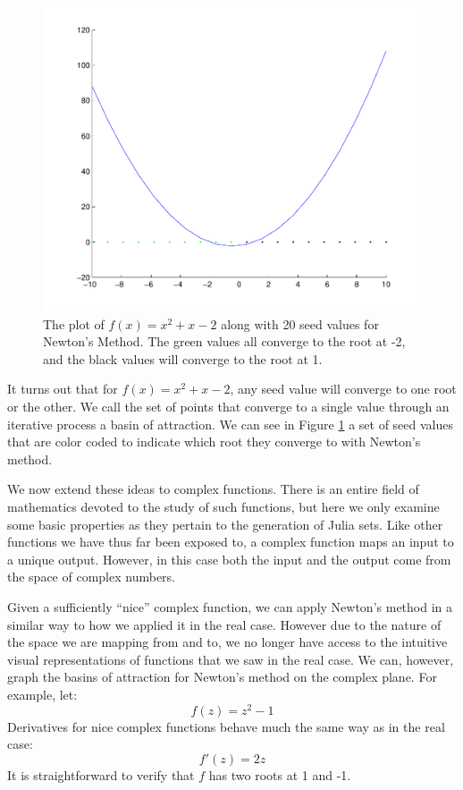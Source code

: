 \begin{figure}
\begin{center}
\includegraphics[scale=0.5]{basins1}
\caption{The plot of $f(x) = x^2 + x - 2$ along with 20 seed values for Newton's Method.
The green values all converge to the root at -2, and the black values will converge to the root at 1.}
\label{Fig:basins1}
\end{center}
\end{figure}

It turns out that for $f(x) = x^2 + x - 2$, any seed value will converge to one root or the other.
We call the set of points that converge to a single value through an iterative process a basin of attraction.
We can see in Figure \ref{Fig:basins1} a set of seed values that are color coded to indicate which root they converge to with Newton's method.

We now extend these ideas to complex functions.
There is an entire field of mathematics devoted to the study of such functions, but here we only examine some basic properties as they pertain to the generation of Julia sets.
Like other functions we have thus far been exposed to, a complex function maps an input to a unique output.
However, in this case both the input and the output come from the space of complex numbers.

Given a sufficiently ``nice'' complex function, we can apply Newton's method in a similar way to how we applied it in the real case.
However due to the nature of the space we are mapping from and to, we no longer have access to the intuitive visual representations of functions that we saw in the real case.
We can, however, graph the basins of attraction for Newton's method on the complex plane.
For example, let:
\[
f(z) = z^2 - 1
\]
Derivatives for nice complex functions behave much the same way as in the real case:
\[
f'(z) = 2z
\]
It is straightforward to verify that $f$ has two roots at 1 and -1.


